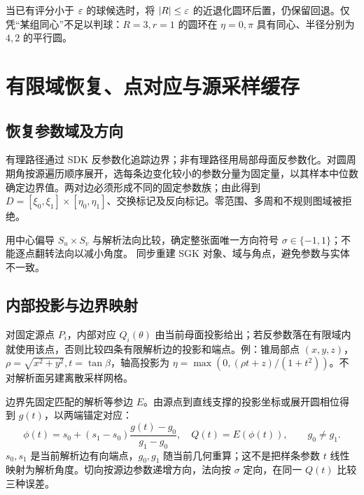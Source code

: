 \begin{center}\end{center}
当已有评分小于 $\varepsilon$ 的球候选时，将 $|R|\le\varepsilon$ 的近退化圆环后置，仍保留回退。仅凭“某组同心”不足以判球：$R=3,r=1$ 的圆环在 $\eta=0,\pi$ 具有同心、半径分别为 $4,2$ 的平行圆。

\clearpage
\section{有限域恢复、点对应与源采样缓存}
\subsection{恢复参数域及方向}
有理路径通过 SDK 反参数化追踪边界；非有理路径用局部母面反参数化。对圆周期角按源遍历顺序展开，选每条边变化较小的参数分量为固定量，以其样本中位数确定边界值。两对边必须形成不同的固定参数族；由此得到 $D=[\xi_0,\xi_1]\times[\eta_0,\eta_1]$、交换标记及反向标记。零范围、多周和不规则图域被拒绝。

用中心偏导 $S_u\times S_v$ 与解析法向比较，确定整张面唯一方向符号 $\sigma\in\{-1,1\}$；不能逐点翻转法向以减小角度。 同步重建 SGK 对象、域与角点，避免参数与实体不一致。

\subsection{内部投影与边界映射}
对固定源点 $P_i$，内部对应 $Q_i(\theta)$ 由当前母面投影给出；若反参数落在有限域内就使用该点，否则比较四条有限解析边的投影和端点。例：锥局部点 $(x,y,z)$，$\rho=\sqrt{x^2+y^2},t=\tan\beta$，轴高投影为 $\eta=\max(0,(\rho t+z)/(1+t^2))$。不对解析面另建离散采样网格。

边界先固定匹配的解析等参边 $E$。由源点到直线支撑的投影坐标或展开圆相位得到 $g(t)$，以两端锚定对应：
\begin{equation}
 \phi(t)=s_0+(s_1-s_0)\frac{g(t)-g_0}{g_1-g_0},\quad
 Q(t)=E(\phi(t)),\qquad g_0\ne g_1.
\end{equation}
$s_0,s_1$ 是当前解析边有向端点，$g_0,g_1$ 随当前几何重算；这不是把样条参数 $t$ 线性映射为解析角度。切向按源边参数递增方向，法向按 $\sigma$ 定向，在同一 $Q(t)$ 比较三种误差。

